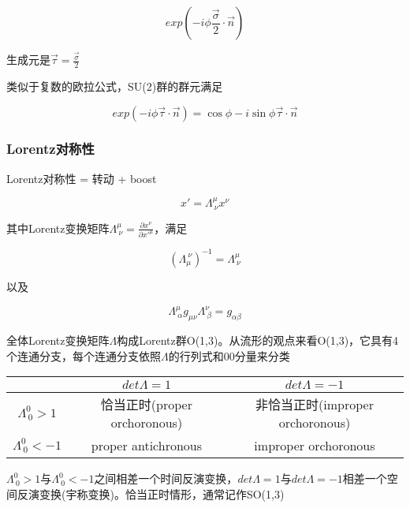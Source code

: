 \begin{equation}
    exp(-i\phi \frac{\vec{\sigma}}{2}\cdot\vec{n})
\end{equation}

生成元是$\vec{\tau}=\frac{\vec{\sigma}}{2}$

类似于复数的欧拉公式，SU(2)群的群元满足

\begin{equation}
    exp(-i\phi\vec{\tau}\cdot\vec{n})=\cos\phi-i\sin\phi\vec{\tau}\cdot\vec{n}
\end{equation}



\subsubsection{Lorentz对称性}

Lorentz对称性 = 转动 + boost

\begin{equation}
    x'=\Lambda^\mu_{\ \nu}x^\nu
\end{equation}

其中Lorentz变换矩阵$\Lambda^\mu_{\ \nu}=\frac{\partial x^\nu}{\partial x'^\mu}$，满足

\begin{equation}
    (\Lambda_\mu^{\ \nu})^{-1}=\Lambda^\mu_{\ \nu}
\end{equation}

以及

\begin{equation}
    \Lambda^\mu_{\ \alpha}g_{\mu\nu}\Lambda^\nu_{\ \beta}=g_{\alpha\beta}
\end{equation}

全体Lorentz变换矩阵$\Lambda$构成Lorentz群O(1,3)。从流形的观点来看O(1,3)，它具有4个连通分支，每个连通分支依照$\Lambda$的行列式和00分量来分类

\begin{center}
    \begin{tabular}{c|c|c}
        \hline
         & $det\Lambda=1$ & $det\Lambda=-1$ \\
        \hline
        $\Lambda^0_{\ 0}>1$ & 恰当正时(proper orchoronous) & 非恰当正时(improper orchoronous) \\
        \hline
        $\Lambda^0_{\ 0}<-1$ & proper antichronous & improper orchoronous \\
        \hline
    \end{tabular}
\end{center}

$\Lambda^0_{\ 0}>1$与$\Lambda^0_{\ 0}<-1$之间相差一个时间反演变换，$det\Lambda=1$与$det\Lambda=-1$相差一个空间反演变换(宇称变换)。恰当正时情形，通常记作SO(1,3)

